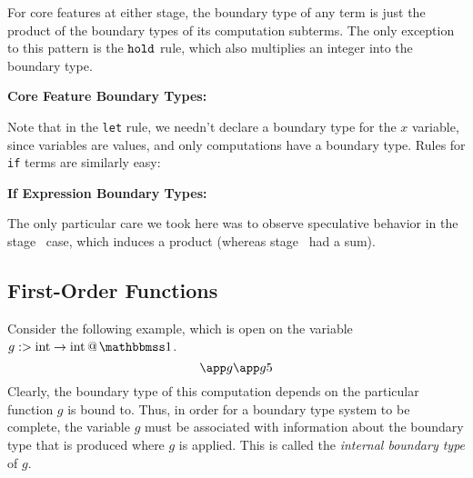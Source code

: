 \documentclass[]{article}
\newcommand {\next}{asdlfkj}
\begin{document}
\begin{abstrsyn}
For core features at either stage, the boundary type of any term is 
just the product of the boundary types of its computation subterms.
The only exception to this pattern is the ${\tt hold}$ rule,
which also multiplies an integer into the boundary type.

\begin{framed}
\noindent\textbf{Core Feature Boundary Types:}
\end{framed}

Note that in the {\tt let} rule, we needn't declare a boundary type for the $x$ variable,
since variables are values, and only computations have a boundary type.
Rules for \texttt{if} terms are similarly easy: 

\begin{framed}
\noindent\textbf{If Expression Boundary Types:}
\end{framed}

The only particular care we took here was to observe speculative behavior in the stage \bbtwo\ case,
which induces a product (whereas stage \bbone\ had a sum).

\subsection {First-Order Functions}

Consider the following example, which is open on the variable \mbox{$\colfun g {\rmint \to \rmint} \bbone$}.
\[
\app g {\app g 5}
\]
Clearly, the boundary type of this computation depends on the particular function $g$ is bound to.
Thus, in order for a boundary type system to be complete,
the variable $g$ must be associated with information about the boundary type that is produced where $g$ is applied.
This is called the \emph{internal boundary type} of $g$.


\end{abstrsyn}
\end{document}
